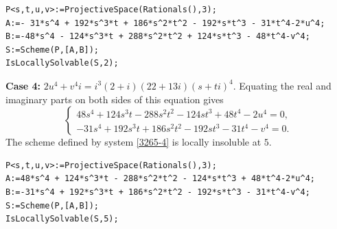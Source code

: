 \documentclass[a4paper,12pt,english,reqno]{amsart}
\begin{document}

\begin{lstlisting}
P<s,t,u,v>:=ProjectiveSpace(Rationals(),3);
A:=- 31*s^4 + 192*s^3*t + 186*s^2*t^2 - 192*s*t^3 - 31*t^4-2*u^4;
B:=-48*s^4 - 124*s^3*t + 288*s^2*t^2 + 124*s*t^3 - 48*t^4-v^4;
S:=Scheme(P,[A,B]);
IsLocallySolvable(S,2);
\end{lstlisting}

{\bf Case 4:} $2u^4+v^4i=i^3(2+i)(22+13i)(s+ti)^4$. Equating the real and imaginary parts on both sides of this equation gives
\begin{equation}\label{3265-4}
\begin{cases}
48s^4 + 124s^3t - 288s^2t^2 - 124st^3 + 48t^4 - 2u^4=0,\\
-31s^4 + 192s^3t + 186s^2t^2 - 192st^3 - 31t^4 - v^4=0.
\end{cases}
\end{equation}
The scheme defined by system \eqref{3265-4} is locally insoluble at $5$.


\begin{lstlisting}
P<s,t,u,v>:=ProjectiveSpace(Rationals(),3);
A:=48*s^4 + 124*s^3*t - 288*s^2*t^2 - 124*s*t^3 + 48*t^4-2*u^4;
B:=-31*s^4 + 192*s^3*t + 186*s^2*t^2 - 192*s*t^3 - 31*t^4-v^4;
S:=Scheme(P,[A,B]);
IsLocallySolvable(S,5);
\end{lstlisting}
\end{document}
